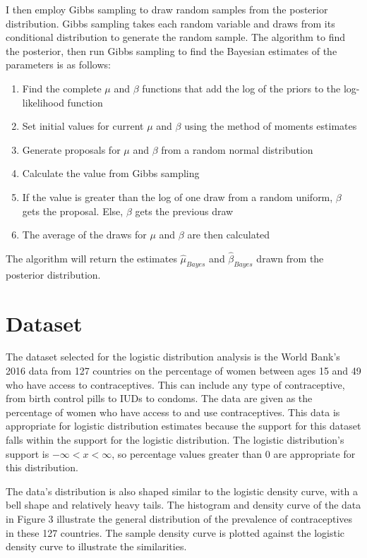 \documentclass{svproc}
\begin{document}
\bigskip

I then employ Gibbs sampling to draw random samples from the posterior distribution. Gibbs sampling takes each random variable and draws from its conditional distribution to generate the random sample. The algorithm to find the posterior, then run Gibbs sampling to find the Bayesian estimates of the parameters is as follows:

\begin{enumerate}
\item Find the complete $\mu$ and $\beta$ functions that add the log of the priors to the log-likelihood function
\item Set initial values for current $\mu$ and $\beta$ using the method of moments estimates
\item Generate proposals for $\mu$ and $\beta$ from a random normal distribution
\item Calculate the value from Gibbs sampling
\item If the value is greater than the log of one draw from a random uniform, $\beta$ gets the proposal. Else, $\beta$ gets the previous draw
\item The average of the draws for $\mu$ and $\beta$ are then calculated
\end{enumerate}

The algorithm will return the estimates $\hat{\mu}_{Bayes}$ and $\hat{\beta}_{Bayes}$ drawn from the posterior distribution.

\section{Dataset}

The dataset selected for the logistic distribution analysis is the World Bank's 2016 data from 127 countries on the percentage of women between ages 15 and 49 who have access to contraceptives. This can include any type of contraceptive, from birth control pills to IUDs to condoms. The data are given as the percentage of women who have access to and use contraceptives. This data is appropriate for logistic distribution estimates because the support for this dataset falls within the support for the logistic distribution. The logistic distribution's support is $-\infty < x < \infty$, so percentage values greater than $0$ are appropriate for this distribution. 

The data's distribution is also shaped similar to the logistic density curve, with a bell shape and relatively heavy tails. The  histogram and density curve of the data in Figure 3 illustrate the general distribution of the prevalence of contraceptives in these 127 countries. The sample density curve is plotted against the logistic density curve to illustrate the similarities.
\end{document}
